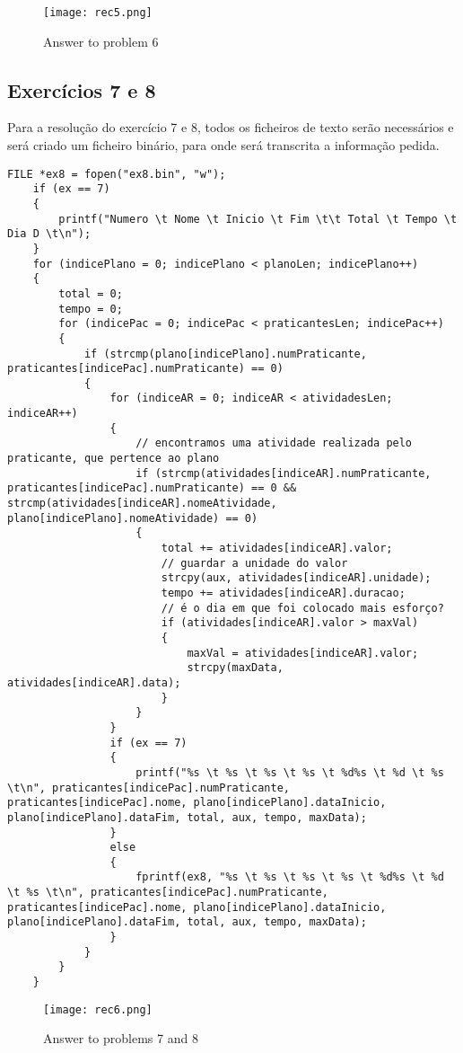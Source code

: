 \begin{figure}[htbp]
\centering
\texttt{[image: rec5.png]}  %
\caption{Answer to problem 6}
\label{fig:ex6}
\end{figure}

\subsection{Exercícios 7 e 8}
Para a resolução do exercício 7 e 8, todos os ficheiros de texto serão necessários e será criado um ficheiro binário, para onde será transcrita a informação pedida.

\begin{lstlisting}[caption=Exemplo exercícios 7 e 8]
FILE *ex8 = fopen("ex8.bin", "w");
    if (ex == 7)
    {
        printf("Numero \t Nome \t Inicio \t Fim \t\t Total \t Tempo \t Dia D \t\n");
    }
    for (indicePlano = 0; indicePlano < planoLen; indicePlano++)
    {
        total = 0;
        tempo = 0;
        for (indicePac = 0; indicePac < praticantesLen; indicePac++)
        {
            if (strcmp(plano[indicePlano].numPraticante, praticantes[indicePac].numPraticante) == 0)
            {
                for (indiceAR = 0; indiceAR < atividadesLen; indiceAR++)
                {
                    // encontramos uma atividade realizada pelo praticante, que pertence ao plano
                    if (strcmp(atividades[indiceAR].numPraticante, praticantes[indicePac].numPraticante) == 0 && strcmp(atividades[indiceAR].nomeAtividade, plano[indicePlano].nomeAtividade) == 0)
                    {
                        total += atividades[indiceAR].valor;
                        // guardar a unidade do valor
                        strcpy(aux, atividades[indiceAR].unidade);
                        tempo += atividades[indiceAR].duracao;
                        // é o dia em que foi colocado mais esforço?
                        if (atividades[indiceAR].valor > maxVal)
                        {
                            maxVal = atividades[indiceAR].valor;
                            strcpy(maxData, atividades[indiceAR].data);
                        }
                    }
                }
                if (ex == 7)
                {
                    printf("%s \t %s \t %s \t %s \t %d%s \t %d \t %s \t\n", praticantes[indicePac].numPraticante, praticantes[indicePac].nome, plano[indicePlano].dataInicio, plano[indicePlano].dataFim, total, aux, tempo, maxData);
                }
                else
                {
                    fprintf(ex8, "%s \t %s \t %s \t %s \t %d%s \t %d \t %s \t\n", praticantes[indicePac].numPraticante, praticantes[indicePac].nome, plano[indicePlano].dataInicio, plano[indicePlano].dataFim, total, aux, tempo, maxData);
                }
            }
        }
    }
\end{lstlisting}

\begin{figure}[htbp]
\centering
\texttt{[image: rec6.png]}  %
\caption{Answer to problems 7 and 8}
\label{fig:ex78}
\end{figure}


	

